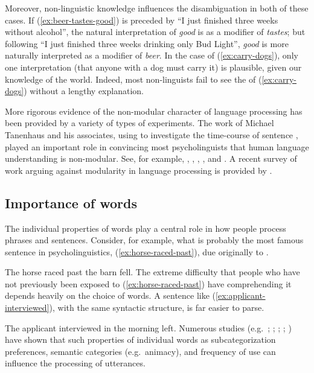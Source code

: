 \documentclass[output=paper,biblatex,babelshorthands,newtxmath,draftmode,colorlinks,citecolor=brown]{langscibook}
\begin{document}
Moreover, non-linguistic knowledge influences the disambiguation in both of these cases.  If (\ref{ex:beer-tastes-good}) is preceded by ``I just finished three weeks without alcohol'', the natural interpretation of \emph{good} is as a modifier of \emph{tastes}; but following ``I just finished three weeks drinking only Bud Light'', \emph{good} is more naturally interpreted as a modifier of \emph{beer}.  In the case of (\ref{ex:carry-dogs}), only one interpretation (that anyone with a dog must carry it) is plausible, given our knowledge of the world.  Indeed, most non-linguists fail to see the  of (\ref{ex:carry-dogs}) without a lengthy explanation.  

More rigorous evidence of the non-modular character of language processing has been provided by a variety of types of experiments.  The work of Michael Tanenhaus  and his associates, using  to investigate the time-course of sentence , played an important role in convincing most psycholinguists that human language understanding is non-modular.  See, for example, \citet{EberhardEtal95}, \citet{McMurrayEtal2008}, \citet{TSKES95a}, \citet{TSKES96a}, and \citet{TanenhausTrueswell95}. A recent survey of work arguing against modularity in language processing is provided by \citet{SpevackEtal2018}.  

\subsection{Importance of words}
\label{sec-importance-of-words}

The individual properties of words play a central role in how people process phrases and sentences.
Consider, for example, what is probably the most famous sentence in psycholinguistics,
(\ref{ex:horse-raced-past}), due originally to \citet[]{Bever70}.

\ea\label{ex:horse-raced-past}
The horse raced past the barn fell.
\z
The extreme difficulty that people who have not previously been exposed to
(\ref{ex:horse-raced-past}) have comprehending it depends heavily on the choice of words.  A
sentence like (\ref{ex:applicant-interviewed}), with the same syntactic structure, is far easier to
parse.

\ea\label{ex:applicant-interviewed}
The applicant interviewed in the morning left.
\z
Numerous studies (e.g.\ \citealt{FordEtal82}; \citealt{TrueswellEtal93}; \citealt{MPS94a-u}; \citealt{BresnanEtal2007}; \citealt{WasowEtal2011}) have shown that such properties of individual words as subcategorization preferences, semantic categories (e.g.\ animacy), and frequency of use can influence the processing of utterances.  
\end{document}
